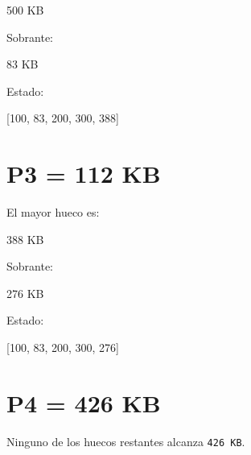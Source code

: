 \documentclass[
  spanish,
  letterpaper,
]{scrbook}
\newenvironment{Shaded}{\begin{snugshade}}{\end{snugshade}}
\newcommand{\NormalTok}[1]{\textcolor[rgb]{0.00,0.23,0.31}{#1}}
\begin{document}
\begin{Shaded}
\begin{Highlighting}[]
\NormalTok{500 KB}
\end{Highlighting}
\end{Shaded}

Sobrante:

\begin{Shaded}
\begin{Highlighting}[]
\NormalTok{83 KB}
\end{Highlighting}
\end{Shaded}

Estado:

\begin{Shaded}
\begin{Highlighting}[]
\NormalTok{[100, 83, 200, 300, 388]}
\end{Highlighting}
\end{Shaded}

\section{P3 = 112 KB}\label{p3-112-kb-5}

El mayor hueco es:

\begin{Shaded}
\begin{Highlighting}[]
\NormalTok{388 KB}
\end{Highlighting}
\end{Shaded}

Sobrante:

\begin{Shaded}
\begin{Highlighting}[]
\NormalTok{276 KB}
\end{Highlighting}
\end{Shaded}

Estado:

\begin{Shaded}
\begin{Highlighting}[]
\NormalTok{[100, 83, 200, 300, 276]}
\end{Highlighting}
\end{Shaded}

\section{P4 = 426 KB}\label{p4-426-kb-5}

Ninguno de los huecos restantes alcanza \texttt{426\ KB}.
\end{document}
